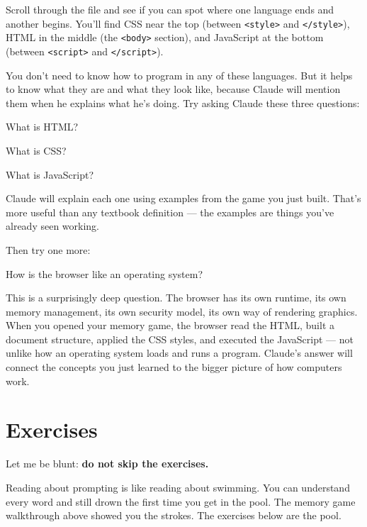 \documentclass[11pt,a4paper]{article}
\begin{document}
Scroll through the file and see if you can spot where one language ends and another begins. You'll find CSS near the top (between \texttt{<style>} and \texttt{</style>}), HTML in the middle (the \texttt{<body>} section), and JavaScript at the bottom (between \texttt{<script>} and \texttt{</script>}).

You don't need to know how to program in any of these languages. But it helps to know what they are and what they look like, because Claude will mention them when he explains what he's doing. Try asking Claude these three questions:

\begin{tcolorbox}[promptbox]
What is HTML?
\end{tcolorbox}

\begin{tcolorbox}[promptbox]
What is CSS?
\end{tcolorbox}

\begin{tcolorbox}[promptbox]
What is JavaScript?
\end{tcolorbox}

Claude will explain each one using examples from the game you just built. That's more useful than any textbook definition --- the examples are things you've already seen working.

Then try one more:

\begin{tcolorbox}[promptbox]
How is the browser like an operating system?
\end{tcolorbox}

This is a surprisingly deep question. The browser has its own runtime, its own memory management, its own security model, its own way of rendering graphics. When you opened your memory game, the browser read the HTML, built a document structure, applied the CSS styles, and executed the JavaScript --- not unlike how an operating system loads and runs a program. Claude's answer will connect the concepts you just learned to the bigger picture of how computers work.

\section{Exercises}

Let me be blunt: \textbf{do not skip the exercises.}

Reading about prompting is like reading about swimming. You can understand every word and still drown the first time you get in the pool. The memory game walkthrough above showed you the strokes. The exercises below are the pool.
\end{document}
